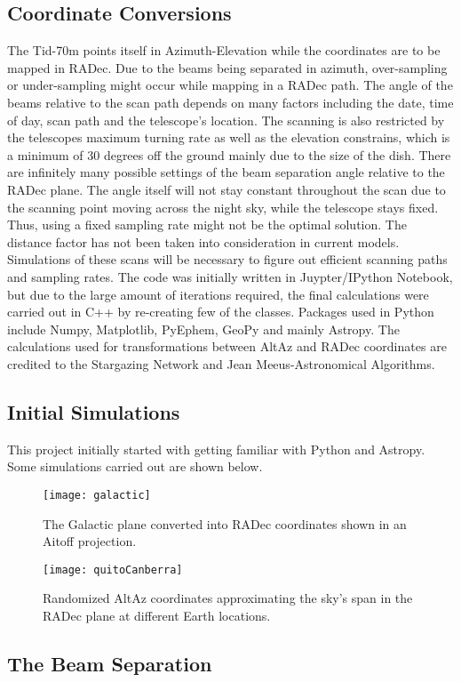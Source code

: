 \documentclass{article}%
\begin{document}
\subsection{Coordinate Conversions}
The Tid-70m points itself in Azimuth-Elevation while the coordinates are to be mapped in RADec. Due to the beams being separated in azimuth, over-sampling or under-sampling might occur while mapping in a RADec path. The angle of the beams relative to the scan path depends on many factors including the date, time of day, scan path and the telescope's location. The scanning is also restricted by the telescopes maximum turning rate as well as the elevation constrains, which is a minimum of 30 degrees off the ground mainly due to the size of the dish.
There are infinitely many possible settings of the beam separation angle relative to the RADec plane. The angle itself will not stay constant throughout the scan due to the scanning point moving across the night sky, while the telescope stays fixed. Thus, using a fixed sampling rate might not be the optimal solution. The distance factor has not been taken into consideration in current models.
Simulations of these scans will be necessary to figure out efficient scanning paths and sampling rates. The code was initially written in Juypter/IPython Notebook, but due to the large amount of iterations required, the final calculations were carried out in C++ by re-creating few of the classes. Packages used in Python include Numpy, Matplotlib, PyEphem, GeoPy and mainly Astropy. The calculations used for transformations between AltAz and RADec coordinates are credited to the Stargazing Network and Jean Meeus-Astronomical Algorithms.

\newpage
\subsection{Initial Simulations}
This project initially started with getting familiar with Python and Astropy. Some simulations carried out are shown below.

\begin{figure}[h!]
\texttt{[image: galactic]}
\caption{The Galactic plane converted into RADec coordinates shown in an Aitoff projection.}

\texttt{[image: quitoCanberra]}
\caption{Randomized AltAz coordinates approximating the sky's span in the RADec plane at different Earth locations.}
\end{figure}
\newpage


\subsection{The Beam Separation}
\end{document}
